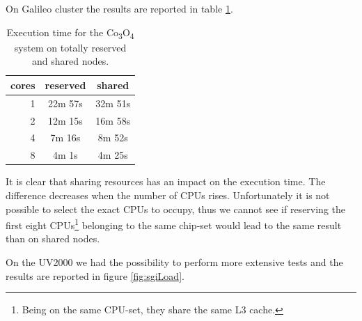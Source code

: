 \documentclass[a4paper,12pt]{article}
\newcommand\CO{Co\textsubscript{3}O\textsubscript{4} }
\begin{document}
On Galileo cluster the results are reported in table \ref{tab:galileoNodeLoad}.

\begin{table}[hhh!]
\centering
\begin{tabular}{r|cc}
\textbf{cores} & \textbf{reserved} & \textbf{shared} \\ \hline \hline
1              & 22m 57s           & 32m 51s         \\ %
2              & 12m 15s           & 16m 58s         \\ %
4              & 7m 16s            & 8m 52s          \\ %
8              & 4m 1s             & 4m 25s             %
\end{tabular}
\caption{Execution time for the \CO system on totally reserved and shared nodes.}
\label{tab:galileoNodeLoad}
\end{table}

It is clear that sharing resources has an impact on the execution time. 
The difference decreases when the number of CPUs rises. 
Unfortunately it is not possible to select the exact CPUs to occupy, thus we cannot see if reserving the first eight CPUs\footnote{Being on the same CPU-set, they share the same L3 cache.} belonging to the same chip-set would lead to the same result than on shared nodes.

On the UV2000 we had the possibility to perform more extensive tests and the results are reported in figure \ref{fig:sgiLoad}.
\end{document}
